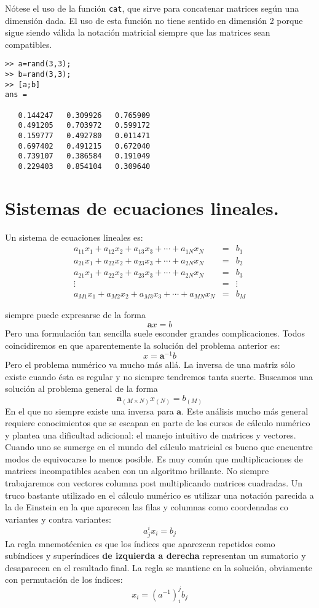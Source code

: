 Nótese el uso de la función \texttt{cat}, que sirve para
concatenar matrices según una dimensión dada.  El uso de esta función
no tiene sentido en dimensión 2 porque sigue siendo válida la notación
matricial siempre que las matrices sean compatibles.

\begin{verbatim}
>> a=rand(3,3);
>> b=rand(3,3);
>> [a;b]
ans =

   0.144247   0.309926   0.765909
   0.491205   0.703972   0.599172
   0.159777   0.492780   0.011471
   0.697402   0.491215   0.672040
   0.739107   0.386584   0.191049
   0.229403   0.854104   0.309640
\end{verbatim}

\section{Sistemas de ecuaciones lineales.}

Un sistema de ecuaciones lineales es: 
\begin{eqnarray*}
a_{11}x_{1}+a_{12}x_{2}+a_{13}x_{3}+\cdots+a_{1N}x_{N} & = & b_{1}\\
a_{21}x_{1}+a_{22}x_{2}+a_{23}x_{3}+\cdots+a_{2N}x_{N} & = & b_{2}\\
a_{21}x_{1}+a_{22}x_{2}+a_{23}x_{3}+\cdots+a_{2N}x_{N} & = & b_{3}\\
\vdots & = & \vdots\\
a_{M1}x_{1}+a_{M2}x_{2}+a_{M3}x_{3}+\cdots+a_{MN}x_{N} & = & b_{M}
\end{eqnarray*}

siempre puede expresarse de la forma
$$\mathbf{a}x=b$$
 Pero una formulación tan sencilla suele esconder grandes complicaciones.
Todos coincidiremos en que aparentemente la solución del problema
anterior es:
$$x=\mathbf{a}^{-1}b$$
Pero el problema numérico va mucho más allá. La inversa de una matriz
sólo existe cuando ésta es regular y no siempre tendremos tanta suerte.
Buscamos una solución al problema general de la forma
$$\mathbf{a}_{(M\times N)}x_{(N)}=b_{(M)}$$
En el que no siempre existe una inversa para $\mathbf{a}$. Este análisis
mucho más general requiere conocimientos que se escapan en parte de
los cursos de cálculo numérico y plantea una dificultad adicional:
el manejo intuitivo de matrices y vectores. Cuando uno se sumerge
en el mundo del cálculo matricial es bueno que encuentre modos de
equivocarse lo menos posible. Es muy común que multiplicaciones de
matrices incompatibles acaben con un algoritmo brillante. No siempre
trabajaremos con vectores columna post multiplicando matrices cuadradas.
Un truco bastante utilizado en el cálculo numérico es utilizar una
notación parecida a la de Einstein en la que aparecen las filas y
columnas como coordenadas co variantes y contra variantes:
$$a_{j}^{i}x_{i}=b_{j}$$
La regla mnemotécnica es que los índices que aparezcan repetidos como
subíndices y superíndices \textbf{de izquierda a derecha} representan
un sumatorio y desaparecen en el resultado final. La regla se mantiene
en la solución, obviamente con permutación de los índices:
$$x_{i}=(a^{-1})_{i}^{j}b_{j}$$


